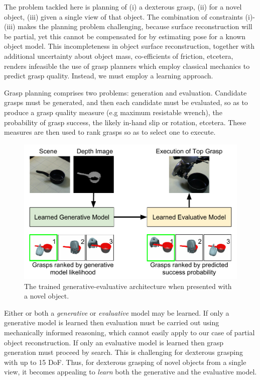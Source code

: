 The problem tackled here is planning of (i) a dexterous grasp, (ii) for a novel object, (iii) given a single view of that object. The combination of constraints (i)-(iii) makes the planning problem challenging, because surface reconstruction will be partial, yet this cannot be compensated for by estimating pose for a known object model. This incompleteness in object surface reconstruction, together with additional uncertainty about object mass, co-efficients of friction, etcetera, renders infeasible the use of grasp planners which employ classical mechanics to predict grasp quality. Instead, we must employ a learning approach.

Grasp planning comprises two problems: generation and evaluation. Candidate grasps must be generated, and then each candidate must be evaluated, so as to produce a grasp quality measure (e.g maximum resistable wrench), the probability of grasp success, the likely in-hand slip or rotation, etcetera. These measures are then used to rank grasps so as to select one to execute.
\begin{figure}[t]
  \includegraphics[width=\columnwidth]{images/contribution.pdf}
  \caption{The trained generative-evaluative architecture when presented with a novel object.}
\label{fig:systemArchitecture}
\end{figure}
Either or both a {\em generative} or {\em evaluative} model may be learned. If only a generative model is learned then evaluation must be carried out using mechanically informed reasoning, which cannot easily apply to our case of partial object reconstruction. If only an evaluative model is learned then grasp generation must proceed by search. This is challenging for dexterous grasping with up to 15 DoF. Thus, for dexterous grasping of novel objects from a single view, it becomes appealing to {\em learn} both the generative and the evaluative model. 

